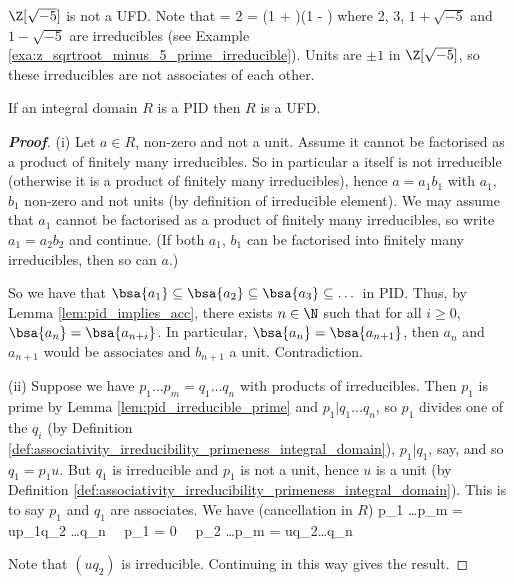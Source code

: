 \begin{example}\label{exa:sqrtroot_3_5_not_ufd}
$\Z[\sqrt{-5}]$ is not a UFD. Note that
 = 2  = (1 + )(1 - )
\ee
where 2, 3, $1 +\sqrt{-5}$ and $1 -\sqrt{-5}$ are irreducibles (see Example \ref{exa:z_sqrtroot_minus_5_prime_irreducible}). Units are $\pm 1$ in $\Z[\sqrt{-5}]$, so these irreducibles are not associates of each other.
\end{example}




\begin{proposition}\label{pro:pid_implies_ufd}
If an integral domain $R$ is a PID then $R$ is a UFD.
\end{proposition}



\begin{proof}[\bf Proof]
\ben
\item [(i)] Let $a \in R$, non-zero and not a unit. Assume it cannot be factorised as a product of finitely many irreducibles. So in particular a itself is not irreducible (otherwise it is a product of finitely many irreducibles), hence $a = a_1b_1$ with $a_1$, $b_1$ non-zero and not units (by definition of irreducible element). We may assume that $a_1$ cannot be factorised as a product of finitely many irreducibles, so write $a_1 = a_2b_2$ and continue. (If both $a_1$, $b_1$ can be factorised into finitely many irreducibles, then so can $a$.)

So we have that $\bsa{a_1} \subseteq \bsa{a_2} \subseteq \bsa{a_3} \subseteq \dots$ in PID. Thus, by Lemma \ref{lem:pid_implies_acc}, there exists $n\in \N$ such that for all $i\geq 0$, $\bsa{a_n} = \bsa{a_{n+i}}$. In particular, $\bsa{a_n} = \bsa{a_{n+1}}$, then $a_n$ and $a_{n+1}$ would be associates and $b_{n+1}$ a unit. Contradiction.


\item [(ii)] Suppose we have $p_1 \dots p_m = q_1 \dots q_n$ with products of irreducibles. Then $p_1$ is prime by Lemma \ref{lem:pid_irreducible_prime} and $p_1 | q_1 \dots q_n$, so $p_1$ divides one of the $q_i$ (by Definition \ref{def:associativity_irreducibility_primeness_integral_domain}), $p_1 | q_1$, say, and so $q_1 = p_1u$. But $q_1$ is irreducible and $p_1$ is not a unit, hence $u$ is a unit (by Definition \ref{def:associativity_irreducibility_primeness_integral_domain}). This is to say $p_1$ and $q_1$ are associates. We have (cancellation in $R$)
\be
p_1 \dots p_m = up_1q_2 \dots q_n \ \ra \ p_1  = 0 \ \ra \ p_2 \dots p_m = uq_2\dots q_n
\ee

Note that $(uq_2)$ is irreducible. Continuing in this way gives the result.
\een
\end{proof}

